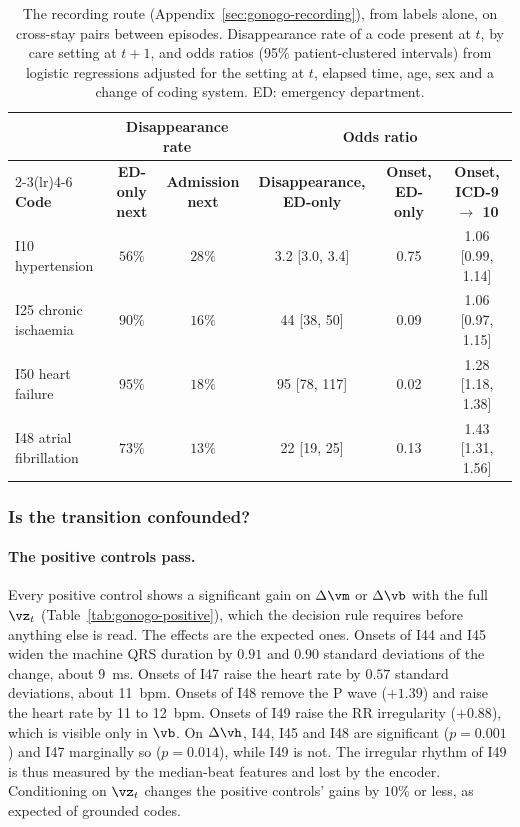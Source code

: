 \begin{table}[t]
\caption{The recording route (Appendix~\ref{sec:gonogo-recording}), from labels alone, on cross-stay pairs between episodes. Disappearance rate of a code present at $t$, by care setting at $t+1$, and odds ratios (95\% patient-clustered intervals) from logistic regressions adjusted for the setting at $t$, elapsed time, age, sex and a change of coding system. ED: emergency department.}
\label{tab:gonogo-recording}
\centering
\small
\begin{tabular}{@{}l cc ccc@{}}
\toprule
& \multicolumn{2}{c}{\textbf{Disappearance rate}} & \multicolumn{3}{c}{\textbf{Odds ratio}} \\
\cmidrule(lr){2-3}\cmidrule(lr){4-6}
\textbf{Code} & \textbf{ED-only next} & \textbf{Admission next} & \textbf{Disappearance, ED-only} & \textbf{Onset, ED-only} & \textbf{Onset, ICD-9 $\to$ 10} \\
\midrule
I10 hypertension          & $56\%$ & $28\%$ & 3.2 [3.0, 3.4] & 0.75 & 1.06 [0.99, 1.14] \\
I25 chronic ischaemia     & $90\%$ & $16\%$ & 44 [38, 50]    & 0.09 & 1.06 [0.97, 1.15] \\
I50 heart failure         & $95\%$ & $18\%$ & 95 [78, 117]   & 0.02 & 1.28 [1.18, 1.38] \\
I48 atrial fibrillation   & $73\%$ & $13\%$ & 22 [19, 25]    & 0.13 & 1.43 [1.31, 1.56] \\
\bottomrule
\end{tabular}
\end{table}

\subsubsection{Is the transition confounded?}
\label{sec:gonogo-c1}

\paragraph{The positive controls pass.} Every positive control shows a significant gain on $\Delta\vm$ or $\Delta\vb$ with the full $\vz_t$ (Table~\ref{tab:gonogo-positive}), which the decision rule requires before anything else is read. The effects are the expected ones. Onsets of I44 and I45 widen the machine QRS duration by $0.91$ and $0.90$ standard deviations of the change, about 9~ms. Onsets of I47 raise the heart rate by $0.57$ standard deviations, about 11~bpm. Onsets of I48 remove the P wave ($+1.39$) and raise the heart rate by 11 to 12~bpm. Onsets of I49 raise the RR irregularity ($+0.88$), which is visible only in $\vb$. On $\Delta\vh$, I44, I45 and I48 are significant ($p=0.001$) and I47 marginally so ($p=0.014$), while I49 is not. The irregular rhythm of I49 is thus measured by the median-beat features and lost by the encoder. Conditioning on $\vz_t$ changes the positive controls' gains by $10\%$ or less, as expected of grounded codes.

